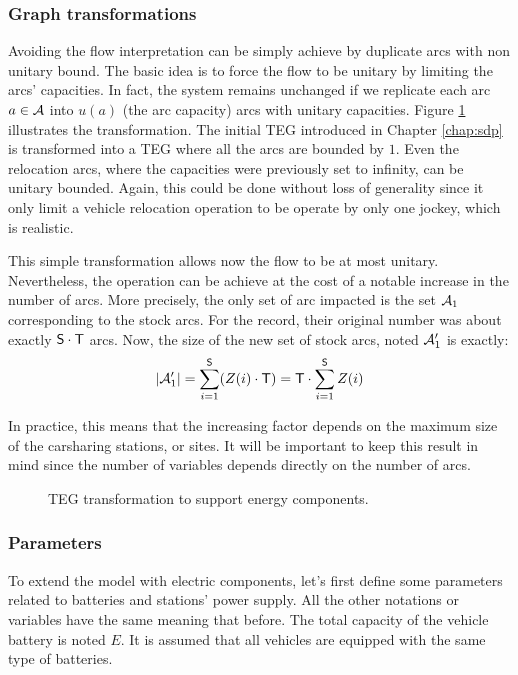 \begin{bibunit}[ieeetr]
\subsubsection{Graph transformations}

Avoiding the flow interpretation can be simply achieve by duplicate arcs with non unitary bound.
The basic idea is to force the flow to be unitary by limiting the arcs' capacities.
In fact, the system remains unchanged if we replicate each arc $a \in \mathcal{A}$ into $u(a)$ (the arc capacity) arcs with unitary capacities.
Figure \ref{fig:tegTransformation} illustrates the transformation.
The initial TEG introduced in Chapter \ref{chap:sdp} is transformed into a TEG where all the arcs are bounded by $1$.
Even the relocation arcs, where the capacities were previously set to infinity, can be unitary bounded.
Again, this could be done without loss of generality since it only limit a vehicle relocation operation to be operate by only one jockey, which is realistic.

\medskip
This simple transformation allows now the flow to be at most unitary.
Nevertheless, the operation can be achieve at the cost of a notable increase in the number of arcs.
More precisely, the only set of arc impacted is the set $\mathcal{A}_1$ corresponding to the stock arcs.
For the record, their original number was about exactly $\mathsf{S} \cdot \mathsf{T}$ arcs.
Now, the size of the new set of stock arcs, noted $\mathcal{A}_1'$ is exactly:
\begin{equation}
|\mathcal{A}_1'| = \sum\limits_{i=1}^{\mathsf{S}} (Z(i) \cdot \mathsf{T}) = \mathsf{T} \cdot \sum\limits_{i=1}^{\mathsf{S}} Z(i)
\end{equation}

In practice, this means that the increasing factor depends on the maximum size of the carsharing stations, or sites.
It will be important to keep this result in mind since the number of variables depends directly on the number of arcs.

\begin{figure}[t]
\begin{center}
\scalebox{0.7}{}
\end{center}
\caption{TEG transformation to support energy components.}
\label{fig:tegTransformation}
\end{figure}

\subsubsection{Parameters}
To extend the model with electric components, let's first define some parameters related to batteries and stations' power supply.
All the other notations or variables have the same meaning that before.
The total capacity of the vehicle battery is noted $E$.
It is assumed that all vehicles are equipped with the same type of batteries.


\end{bibunit}
